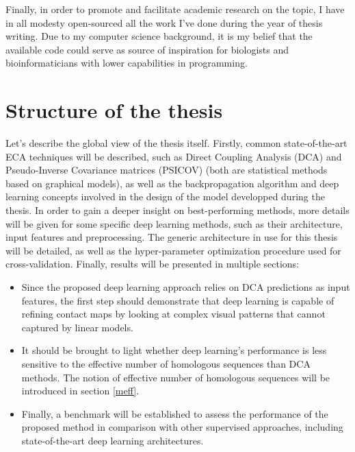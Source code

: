     Finally, in order to promote and facilitate academic research on the topic, I have in all modesty
    open-sourced all the work I've done during the year of thesis writing.
    Due to my computer science background, it is my belief that the
    available code could serve as source of inspiration for biologists and bioinformaticians
    with lower capabilities in programming.

\section{Structure of the thesis}

    Let's describe the global view of the thesis itself.
    Firstly, common state-of-the-art ECA techniques will be described, such as Direct Coupling Analysis (DCA)
    and Pseudo-Inverse Covariance matrices (PSICOV) (both are statistical methods based on graphical models),
    as well as the backpropagation algorithm and deep learning concepts involved in the design
    of the model developped during the thesis.
    In order to gain a deeper insight on best-performing methods, more details will be given for
    some specific deep learning methods, such as their architecture, input features and preprocessing.
    The generic architecture in use for this thesis will be detailed, as well as the hyper-parameter
    optimization procedure used for cross-validation.
    Finally, results will be presented in multiple sections:
    \begin{itemize}
        \item Since the proposed deep learning approach relies on DCA predictions as input features,
        the first step should demonstrate that deep learning is capable of refining
        contact maps by looking at complex visual patterns that cannot captured by linear models.
        \item It should be brought to light whether deep learning's performance is less sensitive to the effective
        number of homologous sequences than DCA methods. The notion of effective number of homologous sequences
        will be introduced in section \ref{meff}.
        \item Finally, a benchmark will be established to assess the performance of the proposed method
        in comparison with other supervised approaches, including state-of-the-art deep learning architectures.
    \end{itemize}
